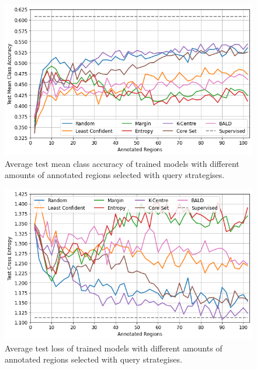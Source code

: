 \begin{figure}
	\centering
	\includegraphics[width=\textwidth]{images/active_learning_mean_class_accuracy.png}
	\caption{Average test mean class accuracy of trained models with different amounts of annotated regions selected with query strategises.}
	\label{fig:active_learning_mean_class_accuracy}
\end{figure}

\begin{figure}
	\centering
	\includegraphics[width=\textwidth]{images/active_learning_loss.png}
	\caption{Average test loss of trained models with different amounts of annotated regions selected with query strategises.}
	\label{fig:active_learning_loss}
\end{figure}



